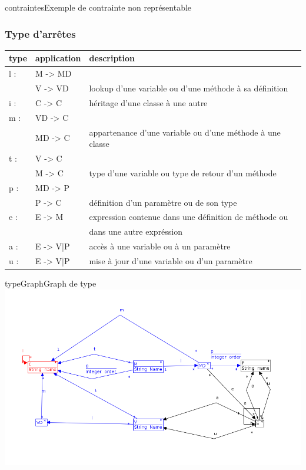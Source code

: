 \documentclass[a4paper, 12pt]{article}
\begin{document}
\begin{figu}{contraintes}{Exemple de contrainte non représentable}
\subsubsection{Type d'arrêtes}
  \begin{tabular}{ | l | l |  l |}
    \hline type & application & description  \\ \hline
    l : & M -> MD & \\ & V -> VD & lookup d'une variable ou d'une méthode à sa définition \\ \hline
    i : & C -> C &  héritage d'une classe à une autre  \\ \hline
    m : & VD -> C & \\ & MD -> C & appartenance d'une variable ou d'une méthode à une classe  \\ \hline
    t : & V -> C  & \\ &  M -> C & type d'une variable ou type de retour d'un méthode   \\ \hline
    p : & MD -> P  & \\ &  P -> C & définition d'un paramètre ou de son type     \\ \hline
    e : & E -> M & expression contenue dans une définition de méthode ou \\ & &  dans une autre expréssion    \\ \hline
    a : & E -> {V|P} & accès à une variable ou à un paramètre    \\ \hline
    u : & E -> {V|P} & mise à jour d'une variable ou d'un paramètre    \\ \hline
   \end{tabular}

\begin{myfig}{typeGraph}{Graph de type}
\includegraphics[width=\textwidth]{typeGraph.png}
\end{myfig}


\end{figu}
\end{document}
